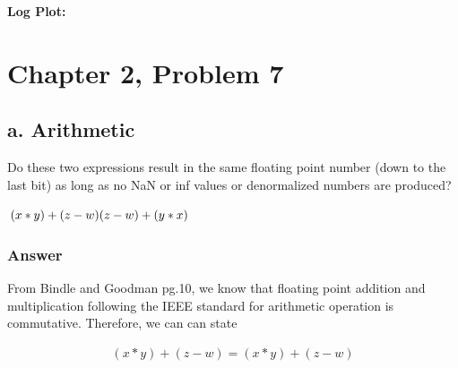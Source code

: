 \documentclass{article}
\newcommand{\n}{\newline}
\begin{document}
\begin{center}
		\textbf{Log Plot: \n}
		
	\end{center}
	\section{Chapter 2, Problem 7}
	
	\subsection{a. Arithmetic}
	Do these two expressions result in the same floating point number (down to the last bit) as long as no NaN or inf values or denormalized numbers are produced? \n
	
	\begin{flushleft}
	\begin{math}
		(x*y)+(z-w)\n
		(z-w)+(y*x)
	\end{math}
	\end{flushleft}
	
	\subsubsection{Answer}
	From Bindle and Goodman pg.10, we know that floating point addition and multiplication following the IEEE standard for arithmetic operation is commutative.  Therefore, we can can state
	
	\begin{equation}
		\begin{split}
		(x*y)+(z-w)=(x*y)+(z-w)
		\end{split}
	\end{equation}
	
\end{document}

